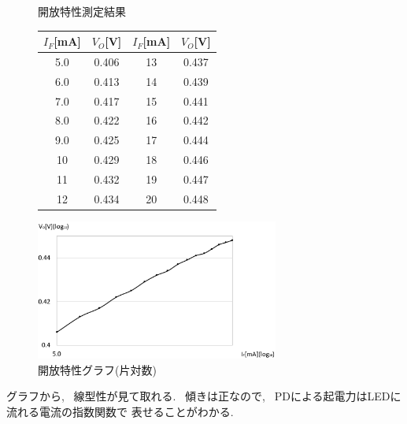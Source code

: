 \documentclass[titlepage]{jsarticle}
\begin{document}
            \begin{figure}[ht]
                \def\@captype{table}
                \begin{minipage}{0.5\hsize}
                    \begin{center}
                        \caption{開放特性測定結果}
                        \label{tab:開放特性結果}
                        \begin{tabular}{c|c||c|c}
                            $I_F$[mA] & $V_O$[V] & $I_F$[mA] & $V_O$[V] \\ \hline
                            5.0 & 0.406 & 13 & 0.437 \\
                            6.0 & 0.413 & 14 & 0.439 \\
                            7.0 & 0.417 & 15 & 0.441 \\
                            8.0 & 0.422 & 16 & 0.442 \\
                            9.0 & 0.425 & 17 & 0.444 \\
                            10 & 0.429 & 18 & 0.446 \\
                            11 & 0.432 & 19 & 0.447 \\
                            12 & 0.434 & 20 & 0.448
                        \end{tabular}
                    \end{center}
                \end{minipage}
                \begin{minipage}{0.5\hsize}
                    \begin{center}
                        \includegraphics[width=8cm]{graphs/kaihou.pdf}
                        \caption{開放特性グラフ(片対数)}
                        \label{fig:開放特性グラフ}
                    \end{center}
                \end{minipage}
            \end{figure}

            グラフから, ~線型性が見て取れる.
            ~傾きは正なので, ~PDによる起電力はLEDに流れる電流の指数関数で
            表せることがわかる. 
\end{document}
